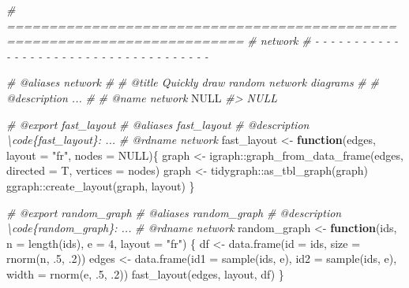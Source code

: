 \documentclass[
]{article}
\newenvironment{Shaded}{\begin{snugshade}}{\end{snugshade}}
\newcommand{\AttributeTok}[1]{\textcolor[rgb]{0.77,0.63,0.00}{#1}}
\newcommand{\CommentTok}[1]{\textcolor[rgb]{0.56,0.35,0.01}{\textit{#1}}}
\newcommand{\ConstantTok}[1]{\textcolor[rgb]{0.00,0.00,0.00}{#1}}
\newcommand{\ControlFlowTok}[1]{\textcolor[rgb]{0.13,0.29,0.53}{\textbf{#1}}}
\newcommand{\DecValTok}[1]{\textcolor[rgb]{0.00,0.00,0.81}{#1}}
\newcommand{\FunctionTok}[1]{\textcolor[rgb]{0.00,0.00,0.00}{#1}}
\newcommand{\NormalTok}[1]{#1}
\newcommand{\OtherTok}[1]{\textcolor[rgb]{0.56,0.35,0.01}{#1}}
\newcommand{\SpecialCharTok}[1]{\textcolor[rgb]{0.00,0.00,0.00}{#1}}
\newcommand{\StringTok}[1]{\textcolor[rgb]{0.31,0.60,0.02}{#1}}
\begin{document}
\begin{Shaded}
\begin{Highlighting}[]
\CommentTok{\# ==========================================================================}
\CommentTok{\# network}
\CommentTok{\# {-} {-} {-} {-} {-} {-} {-} {-} {-} {-} {-} {-} {-} {-} {-} {-} {-} {-} {-} {-} {-} {-} {-} {-} {-} {-} {-} {-} {-} {-} {-} {-} {-} {-} {-} {-} {-}}

\CommentTok{\#\textquotesingle{} @aliases network}
\CommentTok{\#\textquotesingle{}}
\CommentTok{\#\textquotesingle{} @title Quickly draw random network diagrams}
\CommentTok{\#\textquotesingle{}}
\CommentTok{\#\textquotesingle{} @description ...}
\CommentTok{\#\textquotesingle{}}
\CommentTok{\#\textquotesingle{} @name network}
\ConstantTok{NULL}
\CommentTok{\#\textgreater{} NULL}

\CommentTok{\#\textquotesingle{} @export fast\_layout}
\CommentTok{\#\textquotesingle{} @aliases fast\_layout}
\CommentTok{\#\textquotesingle{} @description \textbackslash{}code\{fast\_layout\}: ...}
\CommentTok{\#\textquotesingle{} @rdname network}
\NormalTok{fast\_layout }\OtherTok{\textless{}{-}} \ControlFlowTok{function}\NormalTok{(edges, }\AttributeTok{layout =} \StringTok{"fr"}\NormalTok{, }\AttributeTok{nodes =} \ConstantTok{NULL}\NormalTok{)\{}
\NormalTok{  graph }\OtherTok{\textless{}{-}}\NormalTok{ igraph}\SpecialCharTok{::}\FunctionTok{graph\_from\_data\_frame}\NormalTok{(edges, }\AttributeTok{directed =}\NormalTok{ T, }\AttributeTok{vertices =}\NormalTok{ nodes)}
\NormalTok{  graph }\OtherTok{\textless{}{-}}\NormalTok{ tidygraph}\SpecialCharTok{::}\FunctionTok{as\_tbl\_graph}\NormalTok{(graph)}
\NormalTok{  ggraph}\SpecialCharTok{::}\FunctionTok{create\_layout}\NormalTok{(graph, layout)}
\NormalTok{\}}

\CommentTok{\#\textquotesingle{} @export random\_graph}
\CommentTok{\#\textquotesingle{} @aliases random\_graph}
\CommentTok{\#\textquotesingle{} @description \textbackslash{}code\{random\_graph\}: ...}
\CommentTok{\#\textquotesingle{} @rdname network}
\NormalTok{random\_graph }\OtherTok{\textless{}{-}} \ControlFlowTok{function}\NormalTok{(ids, }\AttributeTok{n =} \FunctionTok{length}\NormalTok{(ids), }\AttributeTok{e =} \DecValTok{4}\NormalTok{, }\AttributeTok{layout =} \StringTok{"fr"}\NormalTok{) \{}
\NormalTok{  df }\OtherTok{\textless{}{-}} \FunctionTok{data.frame}\NormalTok{(}\AttributeTok{id =}\NormalTok{ ids, }\AttributeTok{size =} \FunctionTok{rnorm}\NormalTok{(n, .}\DecValTok{5}\NormalTok{, .}\DecValTok{2}\NormalTok{))}
\NormalTok{  edges }\OtherTok{\textless{}{-}} \FunctionTok{data.frame}\NormalTok{(}\AttributeTok{id1 =} \FunctionTok{sample}\NormalTok{(ids, e), }\AttributeTok{id2 =} \FunctionTok{sample}\NormalTok{(ids, e),}
    \AttributeTok{width =} \FunctionTok{rnorm}\NormalTok{(e, .}\DecValTok{5}\NormalTok{, .}\DecValTok{2}\NormalTok{))}
  \FunctionTok{fast\_layout}\NormalTok{(edges, layout, df)}
\NormalTok{\}}
\end{Highlighting}
\end{Shaded}
\end{document}
